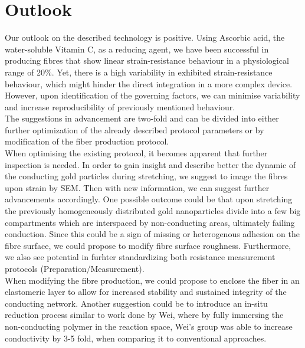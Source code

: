 \hfill \newpage
\section{Outlook}
\label{sec:Outlook}

Our outlook on the described technology is positive. Using Ascorbic acid, the water-soluble Vitamin C, as a reducing agent, we have been successful in producing fibres that show linear strain-resistance behaviour in a physiological range of 20\%. Yet, there is a high variability in exhibited strain-resistance behaviour, which might hinder the direct integration in a more complex device. However, upon identification of the governing factors, we can minimise variability and increase reproducibility of previously mentioned behaviour.\\
The suggestions in advancement are two-fold and can be divided into either further optimization of the already described protocol parameters or by modification of the fiber production protocol.\\
When optimising the existing protocol, it becomes apparent that further inspection is needed. In order to gain insight and describe better the dynamic of the conducting gold particles during stretching, we suggest to image the fibres upon strain by SEM. Then with new information, we can suggest further advancements accordingly. One possible outcome could be that upon stretching the previously homogeneously distributed gold nanoparticles divide into a few big compartments which are interspaced by non-conducting areas, ultimately failing conduction. Since this could be a sign of missing or heterogenous adhesion on the fibre surface, we could propose to modify fibre  surface roughness. Furthermore, we also see potential in furhter standardizing both resistance measurement protocols (Preparation/Measurement).\\
When modifying the fibre production, we could propose to enclose the fiber in an elastomeric layer to allow for increased stability and sustained integrity of the conducting network. Another suggestion could be to introduce an in-situ reduction process similar to work done by Wei, where by fully immersing the non-conducting polymer in the reaction space, Wei's group was able to increase conductivity by 3-5 fold, when comparing it to conventional approaches.\cite{Wei}





